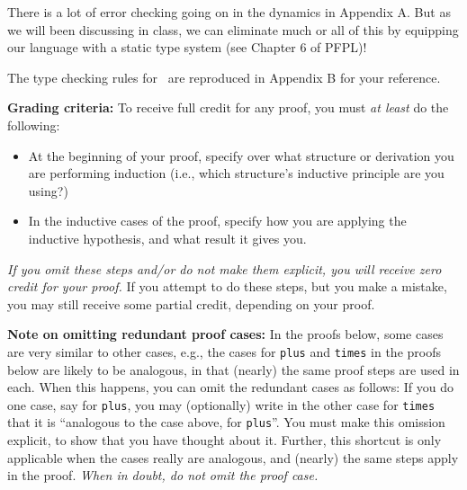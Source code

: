 \documentclass[12pt]{exam}
\begin{document}
\begin{questions}
There is a lot of error checking going on in the dynamics in Appendix A. But as we will been discussing in class, we can eliminate much or all of this by equipping our language with a static type system (see Chapter 6 of PFPL)!

The type checking rules for \Lnumstr~are reproduced in Appendix B for your reference.

\textbf{Grading criteria:} To receive full credit for any proof, you must \emph{at least} do the following:
\begin{itemize}
\item At the beginning of your proof, specify over what structure or derivation you are performing induction (i.e., which structure's inductive principle are you using?)
\item In the inductive cases of the proof, specify how you are applying the inductive hypothesis, and what result it gives you.
\end{itemize}
\emph{If you omit these steps and/or do not make them explicit, you
  will receive zero credit for your proof.}  If you attempt to do
these steps, but you make a mistake, you may still receive some partial credit, depending on your proof.

\textbf{Note on omitting redundant proof cases:} In the proofs below, some cases are very
similar to other cases, e.g., the cases for \texttt{plus} and
\texttt{times} in the proofs below are likely to be analogous, in that
(nearly) the same proof steps are used in each.
%
When this happens, you can omit the redundant cases as follows: If you
do one case, say for \texttt{plus}, you may (optionally) write in the
other case for \texttt{times} that it is ``analogous to the case
above, for \texttt{plus}''.  You must make this omission explicit, to
show that you have thought about it.  Further, this shortcut is only
applicable when the cases really are analogous, and (nearly) the same
steps apply in the proof. \emph{When in doubt, do not omit the
  proof case.}

\end{questions}
\end{document}
